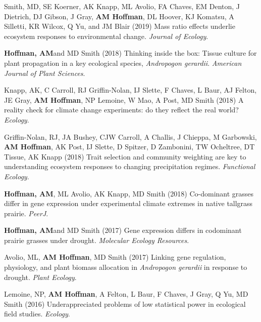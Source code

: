 \documentclass{cv}
\begin{document}
\begin{pubenum}
\item Smith, MD, SE Koerner, AK Knapp, ML Avolio, FA Chaves, EM Denton, J Dietrich, DJ Gibson, J Gray, \textbf{AM Hoffman}, DL Hoover, KJ Komatsu, A Silletti, KR Wilcox, Q Yu, and JM Blair (2019) Mass ratio effects underlie ecosystem responses to environmental change. \textit{Journal of Ecology}. 

\item\textbf{Hoffman, AM}\footnotemark[1] and MD Smith (2018) Thinking inside the box: Tissue culture for plant propagation in a key ecological species, \textit{Andropogon gerardii}. \textit{American Journal of Plant Sciences}.  

\item Knapp, AK, C Carroll, RJ Griffin-Nolan, IJ Slette, F Chaves, L Baur, AJ Felton, JE Gray, \textbf{AM Hoffman}, NP Lemoine, W Mao, A Post, MD Smith (2018) A reality check for climate change experiments: do they reflect the real world? \textit{Ecology}. 

\item Griffin-Nolan, RJ, JA Bushey, CJW Carroll, A Challis, J Chieppa, M Garbowski, \textbf{AM Hoffman}, AK Post, IJ Slette, D Spitzer, D Zambonini, TW Ocheltree, DT Tissue, AK Knapp  (2018) Trait selection and community weighting are key to understanding ecosystem responses to changing precipitation regimes. \textit{Functional Ecology}. 

\item\textbf{Hoffman, AM}, ML Avolio, AK Knapp, MD Smith (2018) Co-dominant grasses differ in gene expression under experimental climate extremes in native tallgrass prairie. \textit{PeerJ}. 

\item\textbf{Hoffman, AM}\footnotemark[1] and MD Smith (2017) Gene expression differs in codominant prairie grasses under drought. \textit{Molecular Ecology Resources}. 

\item Avolio, ML, \textbf{AM Hoffman}, MD Smith (2017) Linking gene regulation, physiology, and plant biomass allocation in \textit{Andropogon gerardii} in response to drought. \textit{Plant Ecology}. 

\item Lemoine, NP, \textbf{AM Hoffman}, A Felton, L Baur, F Chaves, J Gray, Q Yu, MD Smith (2016) Underappreciated problems of low statistical power in ecological field studies. \textit{Ecology}. 


\end{pubenum}
\end{document}
